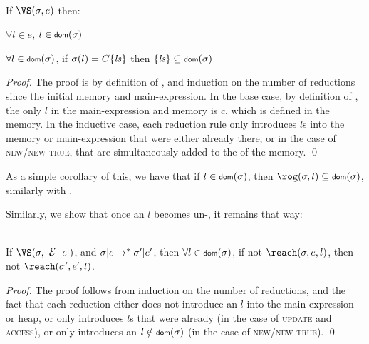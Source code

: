 \SS\begin{Lemma}[No Dangling]\ \\
		\indent If $\VS(\s, e)$ then:
		\begin{iitemize}
			\item $\forall l \in e$, $l \in \dom(\s)$\SS
			\item $\forall l \in \dom(\s)$, if $\sigma(l) = C\{\mathit{ls}\}$ then $\{\ls\} \subseteq \dom(\s)$
		\end{iitemize}
	\end{Lemma}\SS
	\begin{proof}
		The proof is by definition of \VS, and induction on the number of reductions since the initial memory and main-expression.
		In the base case, by definition of \VS, the only $l$ in the main-expression and memory is $c$, which is defined in the memory.
		In the inductive case, each reduction rule only introduces $l$s into the memory or main-expression that were either already there, or in the case of \textsc{new/new true}, that are simultaneously added to the \dom of the memory.
	\qed\end{proof}
	\noindent As a simple corollary of this, we have that if $l \in \dom(\s)$, then $\rog(\s, l) \subseteq \dom(\s)$, similarly with \mrog.

	\LS
	Similarly, we show that once an $l$ becomes un-\reach, it remains that way:
	
\SS\begin{Lemma}\ \\
		\indent If $\VS(\s, \E[e])$, and $\sigma|e \rightarrow^* \sigma'|e'$, then $\forall l \in \dom(\s)$, if not $\reach(\s, e, l)$, then not $\reach(\s', e', l)$.
	\end{Lemma}\SS
	\begin{proof}
		The proof follows from induction on the number of reductions, and the fact that each reduction either does not introduce an $l$ into the main expression or heap,
		or only introduces $l$s that were already \reach (in the case of \textsc{update} and \textsc{access}), or only introduces an $l \notin \dom(\s)$ (in the case of \textsc{new/new true}).
	\qed\end{proof}
	\LS
	
